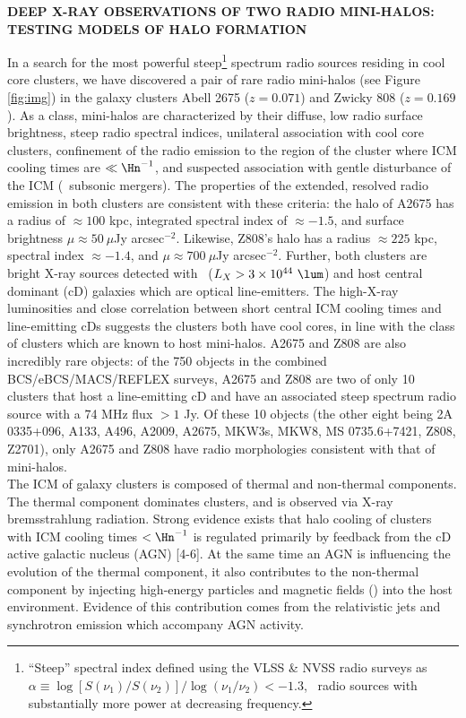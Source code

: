 \documentclass[letterpaper,11pt]{article}
\begin{document}
\pagestyle{plain}

\begin{center}
  {\bf\uppercase{Deep X-ray Observations of Two Radio Mini-Halos:
      Testing Models of Halo Formation}}
\end{center}
In a search for the most powerful steep\footnote{``Steep'' spectral
  index defined using the VLSS \& NVSS radio surveys as $\alpha \equiv
  \log [S(\nu_1)/S(\nu_2)]/\log (\nu_1/\nu_2) < -1.3$, \eg\ radio
  sources with substantially more power at decreasing frequency.}
spectrum radio sources residing in cool core clusters, we have
discovered a pair of rare radio mini-halos (see Figure \ref{fig:img})
in the galaxy clusters Abell 2675 ($z = 0.071$) and Zwicky 808 ($z =
0.169$). As a class, mini-halos are characterized by their diffuse,
low radio surface brightness, steep radio spectral indices, unilateral
association with cool core clusters, confinement of the radio emission
to the region of the cluster where ICM cooling times are $\ll
\Hn^{-1}$, and suspected association with gentle disturbance of the
ICM (\eg\ subsonic mergers). The properties of the extended, resolved
radio emission in both clusters are consistent with these criteria:
the halo of A2675 has a radius of $\approx 100$ kpc, integrated
spectral index of $\approx -1.5$, and surface brightness $\mu \approx
50 ~\mu$Jy arcsec$^{-2}$. Likewise, Z808's halo has a radius $\approx
225$ kpc, spectral index $\approx -1.4$, and $\mu \approx 700 ~\mu$Jy
arcsec$^{-2}$. Further, both clusters are bright X-ray sources
detected with \rosat\ ($L_X > 3 \times 10^{44} ~\lum$) and host
central dominant (cD) galaxies which are optical line-emitters. The
high-X-ray luminosities and close correlation between short central
ICM cooling times and line-emitting cDs suggests the clusters both
have cool cores, in line with the class of clusters which are known to
host mini-halos. A2675 and Z808 are also incredibly rare objects: of
the 750 objects in the combined BCS/eBCS/MACS/REFLEX surveys, A2675
and Z808 are two of only 10 clusters that host a line-emitting cD and
have an associated steep spectrum radio source with a 74 MHz flux $>
1$ Jy. Of these 10 objects (the other eight being 2A 0335+096, A133,
A496, A2009, A2675, MKW3s, MKW8, MS 0735.6+7421, Z808, Z2701), only
A2675 and Z808 have radio morphologies consistent with that of
mini-halos.\\

 The ICM of galaxy
clusters is composed of thermal and non-thermal components. The
thermal component dominates clusters, and is observed via X-ray
bremsstrahlung radiation. Strong evidence exists that halo cooling of
clusters with ICM cooling times $< \Hn^{-1}$ is regulated primarily by
feedback from the cD active galactic nucleus (AGN) [4-6]. At the same
time an AGN is influencing the evolution of the thermal component, it
also contributes to the non-thermal component by injecting high-energy
particles and magnetic fields (\bmag) into the host
environment. Evidence of this contribution comes from the relativistic
jets and synchrotron emission which accompany AGN activity.
\end{document}

